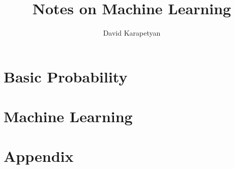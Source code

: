 \documentclass[12pt,reqno]{amsbook}
\theoremstyle{plain}
\theoremstyle{definition}
\theoremstyle{remark}
\numberwithin{section}{chapter}
\numberwithin{equation}{chapter}  %
\begin{document}
\title{Notes on Machine Learning}
\author{David Karapetyan}
\date{}
\maketitle
\frontmatter
\tableofcontents

\mainmatter\part{Basic Probability}

\part{Machine Learning}


\backmatter\part{Appendix}


\end{document}
